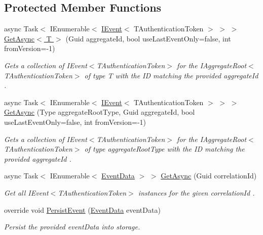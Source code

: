 \subsection*{Protected Member Functions}
\begin{DoxyCompactItemize}
\item 
async Task$<$ I\+Enumerable$<$ \hyperlink{interfaceCqrs_1_1Events_1_1IEvent}{I\+Event}$<$ T\+Authentication\+Token $>$ $>$ $>$ \hyperlink{classCqrs_1_1Azure_1_1DocumentDb_1_1Events_1_1AzureDocumentDbEventStore_a2845015d6fda0d9e79b77b82d9452a4d_a2845015d6fda0d9e79b77b82d9452a4d}{Get\+Async$<$ T $>$} (Guid aggregate\+Id, bool use\+Last\+Event\+Only=false, int from\+Version=-\/1)
\begin{DoxyCompactList}\small\item\em Gets a collection of I\+Event$<$\+T\+Authentication\+Token$>$ for the I\+Aggregate\+Root$<$\+T\+Authentication\+Token$>$ of type {\itshape T}  with the ID matching the provided {\itshape aggregate\+Id} . \end{DoxyCompactList}\item 
async Task$<$ I\+Enumerable$<$ \hyperlink{interfaceCqrs_1_1Events_1_1IEvent}{I\+Event}$<$ T\+Authentication\+Token $>$ $>$ $>$ \hyperlink{classCqrs_1_1Azure_1_1DocumentDb_1_1Events_1_1AzureDocumentDbEventStore_a8b481bf0b0f6b50184441965630f5443_a8b481bf0b0f6b50184441965630f5443}{Get\+Async} (Type aggregate\+Root\+Type, Guid aggregate\+Id, bool use\+Last\+Event\+Only=false, int from\+Version=-\/1)
\begin{DoxyCompactList}\small\item\em Gets a collection of I\+Event$<$\+T\+Authentication\+Token$>$ for the I\+Aggregate\+Root$<$\+T\+Authentication\+Token$>$ of type {\itshape aggregate\+Root\+Type}  with the ID matching the provided {\itshape aggregate\+Id} . \end{DoxyCompactList}\item 
async Task$<$ I\+Enumerable$<$ \hyperlink{classCqrs_1_1Events_1_1EventData}{Event\+Data} $>$ $>$ \hyperlink{classCqrs_1_1Azure_1_1DocumentDb_1_1Events_1_1AzureDocumentDbEventStore_ae44ea4b68f4794022b685bc380abbd04_ae44ea4b68f4794022b685bc380abbd04}{Get\+Async} (Guid correlation\+Id)
\begin{DoxyCompactList}\small\item\em Get all I\+Event$<$\+T\+Authentication\+Token$>$ instances for the given {\itshape correlation\+Id} . \end{DoxyCompactList}\item 
override void \hyperlink{classCqrs_1_1Azure_1_1DocumentDb_1_1Events_1_1AzureDocumentDbEventStore_afe494469614082cf667f5cf4b6c4a97b_afe494469614082cf667f5cf4b6c4a97b}{Persist\+Event} (\hyperlink{classCqrs_1_1Events_1_1EventData}{Event\+Data} event\+Data)
\begin{DoxyCompactList}\small\item\em Persist the provided {\itshape event\+Data}  into storage. \end{DoxyCompactList}\end{DoxyCompactItemize}
